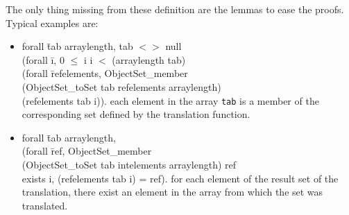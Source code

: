The only thing missing from these definition are the lemmas to ease the proofs. 
Typical examples are: 
\begin{itemize}
\item
\btab
forall \=tab arraylength,
tab $<>$ null \rarrow \+\\
(forall \=i, 0 $\le$ i \conj i $<$ (arraylength tab) \rarrow \+\\
(forall \=refelements, ObjectSet\_member  \+\\
(ObjectSet\_toSet tab refelements arraylength) \\
(refelements tab i)). 
\etab
each element in the array {\tt tab} is a member of the corresponding set defined by the translation
function.
\item
\btab
forall \=tab arraylength,\+\\
(forall \=ref,  ObjectSet\_member \+\\(ObjectSet\_toSet tab intelements arraylength)  ref
\rarrow \\
exists i, (refelements tab i) = ref). 
\etab
for each element of the result set of the translation, there exist an element in the 
array from which the set was translated.
\end{itemize}